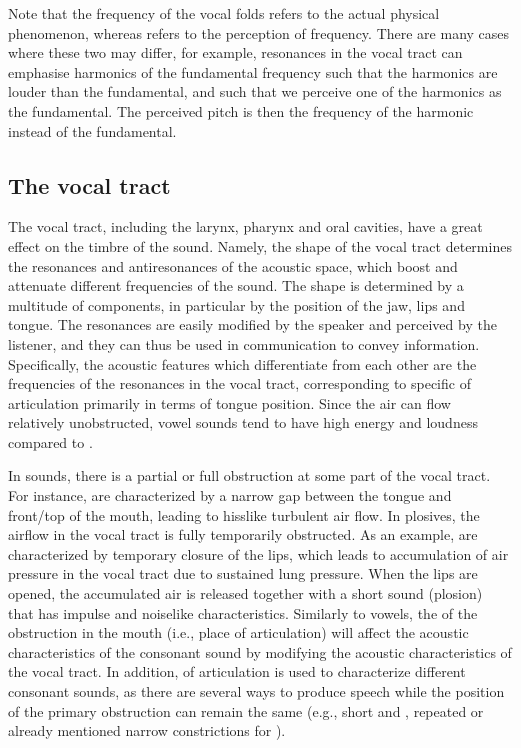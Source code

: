 \documentclass[letterpaper,10pt,english]{jupyterBook}
\begin{document}
\sphinxAtStartPar
Note that the frequency of the vocal folds refers to the actual physical
phenomenon, whereas  refers to the perception of frequency. There
are many cases where these two may differ, for example, resonances in
the vocal tract can emphasise harmonics of the fundamental frequency
such that the harmonics are louder than the fundamental, and such that
we perceive one of the harmonics as the fundamental. The perceived pitch
is then the frequency of the harmonic instead of the fundamental.


\subsection{The vocal tract}
\label{\detokenize{Introduction/Speech_production_and_acoustic_properties:the-vocal-tract}}
\sphinxAtStartPar
The vocal tract, including the larynx, pharynx and oral cavities, have a
great effect on the timbre of the sound. Namely, the shape of the vocal
tract determines the resonances and anti\sphinxhyphen{}resonances of the acoustic
space, which boost and attenuate different frequencies of the sound. The
shape is determined by a multitude of components, in particular by the
position of the jaw, lips and tongue. The resonances are easily modified
by the speaker and perceived by the listener, and they can thus be used
in communication to convey information. Specifically, the acoustic
features which differentiate  from each other are the
frequencies of the resonances in the vocal tract, corresponding to
specific  of articulation primarily in terms of tongue position.
Since the air can flow relatively unobstructed, vowel sounds tend to
have high energy and loudness compared to .

\sphinxAtStartPar
In  sounds, there is a partial or full obstruction at some
part of the vocal tract. For instance,  are
characterized by a narrow gap between the tongue and front/top of the
mouth, leading to hiss\sphinxhyphen{}like turbulent air flow. In plosives, the airflow
in the vocal tract is fully temporarily obstructed. As an example,
 are characterized by temporary closure of the lips,
which leads to accumulation of air pressure in the vocal tract due to
sustained lung pressure. When the lips are opened, the accumulated air
is released together with a short  sound (plosion) that has
impulse\sphinxhyphen{} and noise\sphinxhyphen{}like characteristics. Similarly to vowels, the
 of the obstruction in the mouth (i.e., place of articulation)
will affect the acoustic characteristics of the consonant sound by
modifying the acoustic characteristics of the vocal tract. In addition,
 of articulation is used to characterize different consonant
sounds, as there are several ways to produce speech while the position
of the primary obstruction can remain the same (e.g., short  and
, repeated  or already mentioned narrow constrictions
for ).
\end{document}
